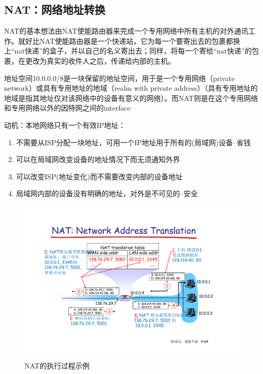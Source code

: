 \documentclass[]{report}
\begin{document}
		\subsection{NAT：网络地址转换}\label{subsection:NAT}
		NAT的基本想法由NAT使能路由器来完成一个专用网络中所有主机的对外通讯工作。就好比NAT使能路由器是一个快递站，它为每一个要寄出去的包裹都换上“nat快递”的盒子，并以自己的名义寄出去；同样，将每一个寄给“nat快递”的包裹，在更改为真实的收件人之后，传递给内部的主机。\par
		地址空间10.0.0.0/8是一块保留的地址空间，用于是一个专用网络（private network）或具有专用地址的地域（realm with private address）（具有专用地址的地域是指其地址仅对该网络中的设备有意义的网络）。而NAT则是在这个专用网络和专用网络以外的因特网之间的interface\par
		动机：本地网络只有一个有效IP地址：
		\begin{enumerate}
			\item 不需要从ISP分配一块地址，可用一个IP地址用于所有的(局域网)设备--省钱
			\item 可以在局域网改变设备的地址情况下而无须通知外界
			\item 可以改变ISP(地址变化)而不需要改变内部的设备地址
			\item 局域网内部的设备没有明确的地址，对外是不可见的--安全
		\end{enumerate}\par
		\begin{figure}[h]
			\centering
			\begin{minipage}{40em}
				\centering
				\includegraphics[scale = 0.4]{images/NAT_example.pdf}
				\caption{NAT的执行过程示例}
			\end{minipage}
		\end{figure}\par
\end{document}
